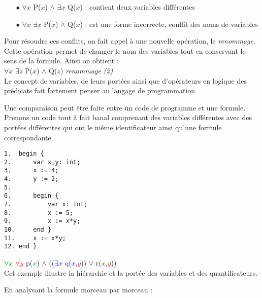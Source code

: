 \begin{itemize}
\item[$\bullet$] $\forall x$ P($x$) $\wedge$ $\exists x$ Q($x$) : contient deux variables différentes\\
 
\item[$\bullet$] $\forall x$ $\exists x$  P($x$) $\wedge$ Q($x$) : est une forme incorrecte, conflit des noms de variables \\
\end{itemize}

Pour résoudre ces conflits, on fait appel à une nouvelle opération, le {\em renommage}.
Cette opération permet de changer le nom des variables tout en conservant le sens de la formule. Ainsi on obtient : \\

$\forall x$ $\exists z$  P($x$) $\wedge$ Q($z$)  \textit{renommage (2)} \\
 
Le concept de variables, de leurs portées ainsi que d'opérateurs en logique des prédicats fait fortement penser au langage de programmation
 
Une comparaison peut être faite entre un code de programme et une formule.
Prenons un code tout à fait banal comprenant des variables différentes avec des portées différentes qui ont le même identificateur ainsi qu'une formule correspondante. 

\begin{verbatim}
1.  begin {
2.      var x,y: int;        
3.      x := 4;
4.      y := 2;
5.    
6.      begin {
7.          var x: int;
8.          x := 5;
9.          x := x*y;
10.     end }
11.     x := x*y;
12. end }
\end{verbatim}


\textcolor{Green}{$\forall x$} \textcolor{Red}{$\forall y$} p(\textcolor{Green}{$x$}) $\wedge$ ((\textcolor{Blue}{$\exists x$}  q(\textcolor{Blue}{$x$},\textcolor{Red}{$y$})) $\vee$ r(\textcolor{Green}{$x$},\textcolor{Red}{$y$}))  \\ 

Cet exemple illustre la hiérarchie et la portée des variables et des quantificateurs.

En analysant la formule morceau par morceau : \\

